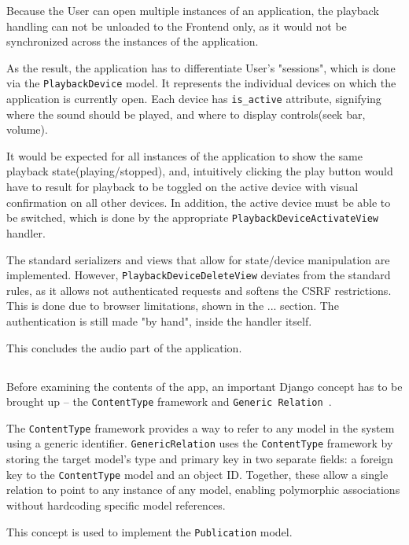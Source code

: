Because the User can open multiple instances of an application, the playback handling can not be
unloaded to the Frontend only, as it would not be synchronized across the instances of the application.

As the result, the application has to differentiate User's "sessions", which is done
via the \texttt{PlaybackDevice} model.
It represents the individual devices on which the application is currently open.
Each device has \texttt{is\_active} attribute, signifying where the sound should be played, and where
to display controls(seek bar, volume).

It would be expected for all instances of the application to show the same playback state(playing/stopped),
and, intuitively clicking the play button would have to result for playback to be toggled on the active device with
visual confirmation on all other devices. In addition, the active device must be able to be switched, which is done
by the appropriate \texttt{PlaybackDeviceActivateView} handler.

The standard serializers and views that allow for state/device manipulation are implemented.
However, \texttt{PlaybackDeviceDeleteView} deviates from the standard rules, as it allows not authenticated requests
and softens the CSRF restrictions. This is done due to browser limitations, shown in the ... section.
The authentication is still made "by hand", inside the handler itself.

This concludes the audio part of the application.

\subsection{}\label{subsec:social}
Before examining the contents of the  app, an important Django concept
has to be brought up -- the \texttt{ContentType} framework and \texttt{Generic Relation}~\cite{djangocontenttype}.

The \texttt{ContentType} framework provides a way to refer to any model in the system
using a generic identifier.
\texttt{GenericRelation} uses the \texttt{ContentType} framework by storing the target
model’s type and primary key in two separate fields: a foreign key to the
\texttt{ContentType} model and an object ID.
Together, these allow a single relation to point to any instance of any model,
enabling polymorphic associations without hardcoding specific model references.

This concept is used to implement the \texttt{Publication} model.

